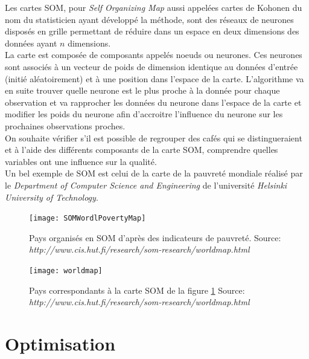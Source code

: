 Les cartes SOM, pour \textit{Self Organizing Map} aussi appelées cartes de Kohonen du nom du statisticien ayant développé la méthode, sont des réseaux de neurones disposés en grille permettant de réduire dans un espace en deux dimensions des données ayant $n$ dimensions.\\
 

\noindent La carte est composée de composants appelés noeuds ou neurones. Ces neurones sont associés à un vecteur de poids de dimension identique au données d'entrée (initié aléatoirement) et à une position dans l'espace de la carte. L'algorithme va en suite trouver quelle neurone est le plus proche à la donnée pour chaque observation et va rapprocher les données du neurone dans l'espace de la carte et modifier les poids du neurone afin d'accroitre l'influence du neurone sur les prochaines observations proches\cite{Kohonen:1988:SFT:65669.104428}.\\


\noindent On souhaite vérifier s'il est possible de regrouper des cafés qui se distingueraient et à l'aide des différents composants de la carte SOM, comprendre quelles variables ont une influence sur la qualité. \\
 

\noindent Un bel exemple de SOM est celui de la carte de la pauvreté mondiale réalisé par le \textit{Department of Computer Science and Engineering} de l'université \textit{Helsinki University of Technology}. 

\begin{figure}[H]
	\texttt{[image: SOMWordlPovertyMap]}
	\caption{\label{SOMPovertyMap} Pays organisés en SOM d'après des indicateurs de pauvreté. \newline Source: \textit{http://www.cis.hut.fi/research/som-research/worldmap.html}}
\end{figure}

\begin{figure}[H]
	\texttt{[image: worldmap]}
	\caption{\label{WorldPovertyMap} Pays correspondants à la carte SOM de la figure \ref{SOMPovertyMap} \newline Source: \textit{http://www.cis.hut.fi/research/som-research/worldmap.html}}
\end{figure}



\newpage
\section{Optimisation}

